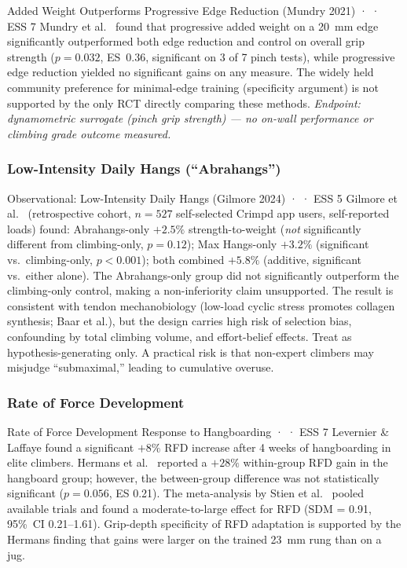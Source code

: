 \begin{evidencebox}{Added Weight Outperforms Progressive Edge Reduction (Mundry 2021) · \evidencebacked · ESS 7}
Mundry et al.\ \cite{MSA+21} found that progressive added weight on a 20~mm edge significantly outperformed both edge reduction and control on overall grip strength ($p=0.032$, ES~$0.36$, significant on 3 of 7 pinch tests), while progressive edge reduction yielded no significant gains on any measure. The widely held community preference for minimal-edge training (specificity argument) is not supported by the only RCT directly comparing these methods. \textit{Endpoint: dynamometric surrogate (pinch grip strength) — no on-wall performance or climbing grade outcome measured.}
\end{evidencebox}

\subsubsection{Low-Intensity Daily Hangs (``Abrahangs'')}

\begin{bioplausbox}{Observational: Low-Intensity Daily Hangs (Gilmore 2024) · \bioplausible · ESS 5}
Gilmore et al.\ \cite{GKAO24} (retrospective cohort, $n = 527$ self-selected Crimpd app users, self-reported loads) found: Abrahangs-only $+2.5\%$ strength-to-weight (\textit{not} significantly different from climbing-only, $p = 0.12$); Max Hangs-only $+3.2\%$ (significant vs.\ climbing-only, $p < 0.001$); both combined $+5.8\%$ (additive, significant vs.\ either alone). The Abrahangs-only group did not significantly outperform the climbing-only control, making a non-inferiority claim unsupported. The result is consistent with tendon mechanobiology (low-load cyclic stress promotes collagen synthesis; Baar et al.), but the design carries high risk of selection bias, confounding by total climbing volume, and effort-belief effects. Treat as hypothesis-generating only. A practical risk is that non-expert climbers may misjudge ``submaximal,'' leading to cumulative overuse.
\end{bioplausbox}

\subsubsection{Rate of Force Development}

\begin{evidencebox}{Rate of Force Development Response to Hangboarding · \evidencebacked · ESS 7}
Levernier \& Laffaye \cite{LL19} found a significant $+8\%$ RFD increase after 4 weeks of hangboarding in elite climbers. Hermans et al.\ \cite{HO22} reported a $+28\%$ within-group RFD gain in the hangboard group; however, the between-group difference was not statistically significant ($p = 0.056$, ES 0.21). The meta-analysis by Stien et al.\ \cite{SO23} pooled available trials and found a moderate-to-large effect for RFD (SDM = 0.91, 95\%~CI 0.21--1.61). Grip-depth specificity of RFD adaptation is supported by the Hermans finding that gains were larger on the trained 23~mm rung than on a jug.
\end{evidencebox}

